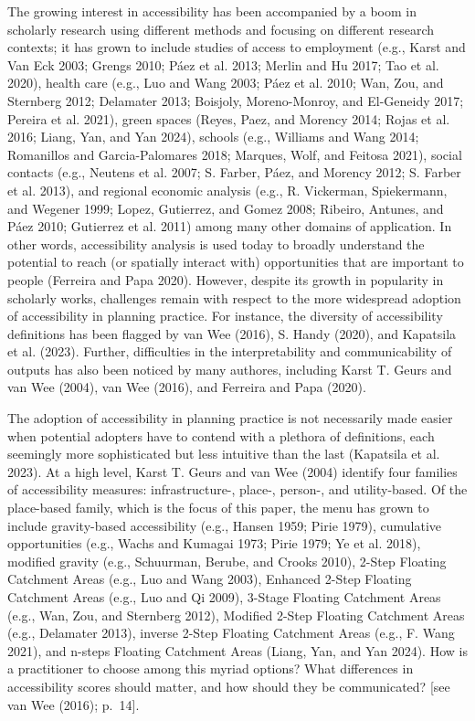 \documentclass[
]{article}
\begin{document}
The growing interest in accessibility has been accompanied by a boom in
scholarly research using different methods and focusing on different
research contexts; it has grown to include studies of access to
employment (e.g., Karst and Van Eck 2003; Grengs 2010; Páez et al. 2013;
Merlin and Hu 2017; Tao et al. 2020), health care (e.g., Luo and Wang
2003; Páez et al. 2010; Wan, Zou, and Sternberg 2012; Delamater 2013;
Boisjoly, Moreno-Monroy, and El-Geneidy 2017; Pereira et al. 2021),
green spaces (Reyes, Paez, and Morency 2014; Rojas et al. 2016; Liang,
Yan, and Yan 2024), schools (e.g., Williams and Wang 2014; Romanillos
and Garcia-Palomares 2018; Marques, Wolf, and Feitosa 2021), social
contacts (e.g., Neutens et al. 2007; S. Farber, Páez, and Morency 2012;
S. Farber et al. 2013), and regional economic analysis (e.g., R.
Vickerman, Spiekermann, and Wegener 1999; Lopez, Gutierrez, and Gomez
2008; Ribeiro, Antunes, and Páez 2010; Gutierrez et al. 2011) among many
other domains of application. In other words, accessibility analysis is
used today to broadly understand the potential to reach (or spatially
interact with) opportunities that are important to people (Ferreira and
Papa 2020). However, despite its growth in popularity in scholarly
works, challenges remain with respect to the more widespread adoption of
accessibility in planning practice. For instance, the diversity of
accessibility definitions has been flagged by van Wee (2016), S. Handy
(2020), and Kapatsila et al. (2023). Further, difficulties in the
interpretability and communicability of outputs has also been noticed by
many authores, including Karst T. Geurs and van Wee (2004), van Wee
(2016), and Ferreira and Papa (2020).

The adoption of accessibility in planning practice is not necessarily
made easier when potential adopters have to contend with a plethora of
definitions, each seemingly more sophisticated but less intuitive than
the last (Kapatsila et al. 2023). At a high level, Karst T. Geurs and
van Wee (2004) identify four families of accessibility measures:
infrastructure-, place-, person-, and utility-based. Of the place-based
family, which is the focus of this paper, the menu has grown to include
gravity-based accessibility (e.g., Hansen 1959; Pirie 1979), cumulative
opportunities (e.g., Wachs and Kumagai 1973; Pirie 1979; Ye et al.
2018), modified gravity (e.g., Schuurman, Berube, and Crooks 2010),
2-Step Floating Catchment Areas (e.g., Luo and Wang 2003), Enhanced
2-Step Floating Catchment Areas (e.g., Luo and Qi 2009), 3-Stage
Floating Catchment Areas (e.g., Wan, Zou, and Sternberg 2012), Modified
2-Step Floating Catchment Areas (e.g., Delamater 2013), inverse 2-Step
Floating Catchment Areas (e.g., F. Wang 2021), and n-steps Floating
Catchment Areas (Liang, Yan, and Yan 2024). How is a practitioner to
choose among this myriad options? What differences in accessibility
scores should matter, and how should they be communicated? {[}see van
Wee (2016); p.~14{]}.
\end{document}
